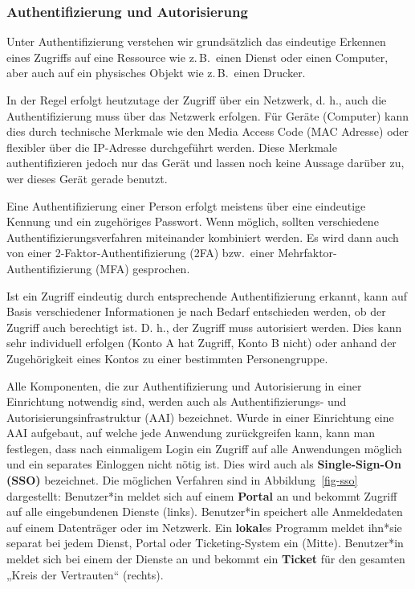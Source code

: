 \documentclass[
  11pt,
  letterpaper,
  DIV=11,
  twoside]{scrreprt}
\begin{document}
\subsubsection{Authentifizierung und
Autorisierung}\label{authentifizierung-und-autorisierung}

Unter Authentifizierung verstehen wir grundsätzlich das eindeutige
Erkennen eines Zugriffs auf eine Ressource wie z.\,B.~einen Dienst oder
einen Computer, aber auch auf ein physisches Objekt wie z.\,B.~einen
Drucker.

In der Regel erfolgt heutzutage der Zugriff über ein Netzwerk, d. h.,
auch die Authentifizierung muss über das Netzwerk erfolgen. Für Geräte
(Computer) kann dies durch technische Merkmale wie den Media Access Code
(MAC Adresse) oder flexibler über die IP-Adresse durchgeführt werden.
Diese Merkmale authentifizieren jedoch nur das Gerät und lassen noch
keine Aussage darüber zu, wer dieses Gerät gerade benutzt.

Eine Authentifizierung einer Person erfolgt meistens über eine
eindeutige Kennung und ein zugehöriges Passwort. Wenn möglich, sollten
verschiedene Authentifizierungsverfahren miteinander kombiniert werden.
Es wird dann auch von einer 2-Faktor-Authentifizierung (2FA) bzw.~einer
Mehrfaktor-Authentifizierung (MFA) gesprochen.

Ist ein Zugriff eindeutig durch entsprechende Authentifizierung erkannt,
kann auf Basis verschiedener Informationen je nach Bedarf entschieden
werden, ob der Zugriff auch berechtigt ist. D. h., der Zugriff muss
autorisiert werden. Dies kann sehr individuell erfolgen (Konto A hat
Zugriff, Konto B nicht) oder anhand der Zugehörigkeit eines Kontos zu
einer bestimmten Personengruppe.

Alle Komponenten, die zur Authentifizierung und Autorisierung in einer
Einrichtung notwendig sind, werden auch als Authentifizierungs- und
Autorisierungsinfrastruktur (AAI) bezeichnet. Wurde in einer Einrichtung
eine AAI aufgebaut, auf welche jede Anwendung zurückgreifen kann, kann
man festlegen, dass nach einmaligem Login ein Zugriff auf alle
Anwendungen möglich und ein separates Einloggen nicht nötig ist. Dies
wird auch als \textbf{Single-Sign-On (SSO)} bezeichnet. Die möglichen
Verfahren sind in Abbildung~\ref{fig-sso} dargestellt: Benutzer*in
meldet sich auf einem \textbf{Portal} an und bekommt Zugriff auf alle
eingebundenen Dienste (links). Benutzer*in speichert alle Anmeldedaten
auf einem Datenträger oder im Netzwerk. Ein \textbf{lokal}es Programm
meldet ihn*sie separat bei jedem Dienst, Portal oder Ticketing-System
ein (Mitte). Benutzer*in meldet sich bei einem der Dienste an und
bekommt ein \textbf{Ticket} für den gesamten „Kreis der Vertrauten``
(rechts).
\end{document}
